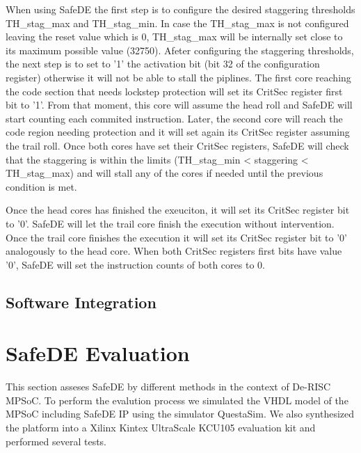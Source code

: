 When using SafeDE the first step is to configure the desired staggering thresholds TH\_stag\_max and TH\_stag\_min. In case the TH\_stag\_max is not configured leaving the reset value which is 0, TH\_stag\_max will be internally set close to its maximum possible value (32750). Afeter configuring the staggering thresholds, the next step is to set to '1' the activation bit (bit 32 of the configuration register) otherwise it will not be able to stall the piplines. The first core reaching the code section that needs lockstep protection will set its CritSec register first bit to '1'. From that moment, this core will assume the head roll and SafeDE will start counting each commited instruction. Later, the second core will reach the code region needing protection and it will set again its CritSec register assuming the trail roll. Once both cores have set their CritSec registers, SafeDE will check that the staggering is within the limits (TH\_stag\_min < staggering < TH\_stag\_max) and will stall any of the cores if needed until the previous condition is met.  

Once the head cores has finished the exeuciton, it will set its CritSec register bit to '0'. SafeDE will let the trail core finish the execution without intervention. Once the trail core finishes the execution it will set its CritSec register bit to '0' analogously to the head core. When both CritSec registers first bits have value '0', SafeDE will set the instruction counts of both cores to 0.


\subsection{Software Integration}



\section{SafeDE Evaluation}
This section asseses SafeDE by different methods in the context of De-RISC MPSoC. To perform the evalution process we simulated the VHDL model of the MPSoC including SafeDE IP using the simulator QuestaSim. We also synthesized the platform into a Xilinx Kintex UltraScale KCU105 evaluation kit and performed several tests. 

